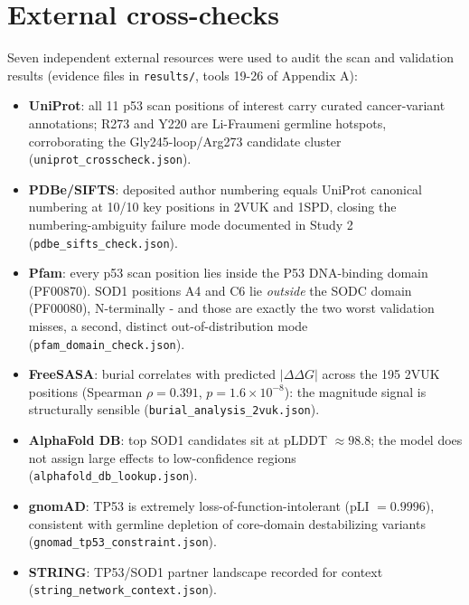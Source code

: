 \documentclass[11pt]{article}
\begin{document}
\section{External cross-checks}
\label{sec:crosscheck}
Seven independent external resources were used to audit the scan and
validation results (evidence files in \texttt{results/}, tools 19-26 of
Appendix A):
\begin{itemize}
\item \textbf{UniProt}: all 11 p53 scan positions of interest carry
curated cancer-variant annotations; R273 and Y220 are Li-Fraumeni
germline hotspots, corroborating the Gly245-loop/Arg273 candidate
cluster (\texttt{uniprot\_crosscheck.json}).
\item \textbf{PDBe/SIFTS}: deposited author numbering equals UniProt
canonical numbering at 10/10 key positions in 2VUK and 1SPD, closing
the numbering-ambiguity failure mode documented in Study 2
(\texttt{pdbe\_sifts\_check.json}).
\item \textbf{Pfam}: every p53 scan position lies inside the P53
DNA-binding domain (PF00870). SOD1 positions A4 and C6 lie
\emph{outside} the SODC domain (PF00080), N-terminally - and those are
exactly the two worst validation misses, a second, distinct
out-of-distribution mode (\texttt{pfam\_domain\_check.json}).
\item \textbf{FreeSASA}: burial correlates with predicted
$|\Delta\Delta G|$ across the 195 2VUK positions (Spearman
$\rho=0.391$, $p=1.6\times10^{-8}$): the magnitude signal is
structurally sensible (\texttt{burial\_analysis\_2vuk.json}).
\item \textbf{AlphaFold DB}: top SOD1 candidates sit at pLDDT
$\approx98.8$; the model does not assign large effects to
low-confidence regions (\texttt{alphafold\_db\_lookup.json}).
\item \textbf{gnomAD}: TP53 is extremely loss-of-function-intolerant
(pLI $=0.9996$), consistent with germline depletion of core-domain
destabilizing variants (\texttt{gnomad\_tp53\_constraint.json}).
\item \textbf{STRING}: TP53/SOD1 partner landscape recorded for
context (\texttt{string\_network\_context.json}).
\end{itemize}
\end{document}
